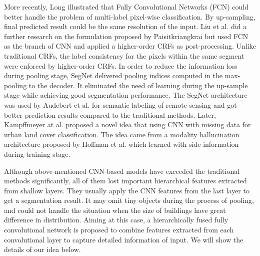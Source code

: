 \setlength{\parindent}{2ex}More recently, Long \cite{IEEEexample:Long_2015_CVPR} illustrated that Fully Convolutional Networks (FCN) could better handle the problem of multi-label pixel-wise classification. By up-sampling, final predicted result could be the same resolution of the input. Liu et al. \cite{IEEEexample:liu2017dense} did a further research on the formulation proposed by Paisitkriangkrai \cite{IEEEexample:paisitkriangkrai2015effective} but used FCN as the branch of CNN and applied a higher-order CRFs as post-processing. Unlike traditional CRFs, the label consistency for the pixels within the same segment were enforced by higher-order CRFs. In order to reduce the information loss during pooling stage, SegNet \cite{IEEEexample:badrinarayanan2017segnet} delivered pooling indices computed in the max-pooling to the decoder. It eliminated the need of learning during the up-sample stage while achieving good segmentation performance. The SegNet architecture was used by Audebert et al. \cite{IEEEexample:audebert2017deep} for semantic labeling of remote sensing and got better prediction results compared to the traditional methods. Later, Kampffmeyer at al. \cite{IEEEexample:kampffmeyer2017urban} proposed a novel idea that using CNN with missing data for urban land cover classification. The idea came from a modality hallucination architecture proposed by Hoffman et al. \cite{IEEEexample:hoffman2016learning} which learned with side information during training stage.\par

Although above-mentioned CNN-based models have exceeded the traditional methods significantly, all of them lost important hierarchical features extracted from shallow layers. They usually apply the CNN features from the last layer to get a segmentation result. It may omit tiny objects during the process of pooling, and could not handle the situation when the size of buildings have great difference in distribution. Aiming at this case, a hierarchically fused fully convolutional network is proposed to combine features extracted from each convolutional layer to capture detailed information of input. We will show the details of our idea below.
